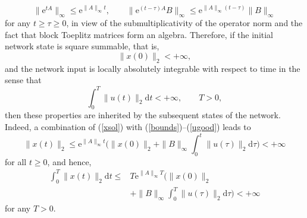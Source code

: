 \documentclass[letterpaper, 10pt, conference]{ieeeconf}  %
\def\<{\leqslant}           %
\def\>{\geqslant}           %
\def\bra{{\langle}}
\def\ket{{\rangle}}
\def\re{\mathrm{e}}        %
\def\rd{\mathrm{d}}        %
\begin{document}
\begin{equation}
\label{bounds}
    \|\re^{tA}\|_{\infty} \< \re^{\|A\|_{\infty} t},
    \qquad
    \|\re^{(t-\tau)A} B\|_{\infty} \< \re^{\|A\|_{\infty}(t-\tau)}\|B\|_{\infty}
\end{equation}
for any $t\> \tau \> 0$, in view of
the submultiplicativity of the operator norm and the fact that block Toeplitz matrices form an algebra.
Therefore, if the initial network state is square summable, that is,
\begin{equation}
\label{x0norm}
    \|x(0)\|_2 < +\infty,
\end{equation}
and the network input is locally absolutely integrable with respect to time in the sense that
\begin{equation}
\label{ugood}
    \int_0^T
    \|u(t)\|_2
    \rd t
    <+\infty,
    \qquad
    T>0,
\end{equation}
then these properties are inherited by the subsequent states of the network. Indeed, a combination of (\ref{xsol}) with (\ref{bounds})--(\ref{ugood}) leads to
 \begin{equation}
\label{xgood}
    \|x(t)\|_2
    \<
    \re^{\|A\|_{\infty}t}
    \Big(
        \|x(0)\|_2
        +
    \|B\|_{\infty}
    \int_0^t
    \|u(\tau)\|_2
    \rd \tau
    \Big)
    <+\infty
\end{equation}
for all $t\>0$, and hence,
 \begin{align}
\nonumber
    \int_0^T
    \|x(t)\|_2
    \rd t
    \< &
    T
    \re^{\|A\|_{\infty}T}
    \Big(
        \|x(0)\|_2\\
\label{xgood1}
        & +
    \|B\|_{\infty}
    \int_0^T
    \|u(\tau)\|_2
    \rd \tau
    \Big)
    <+\infty
\end{align}
for any $T>0$.
\end{document}
